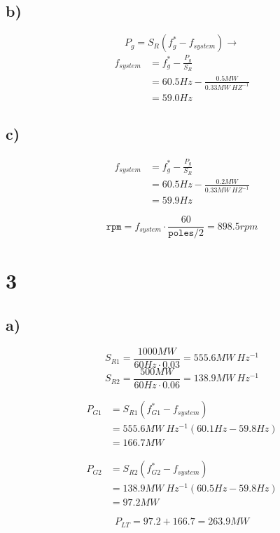 \documentclass[fleqn, twocolumn]{article}
\begin{document}
\subsection*{b)}
\label{sec:org7147f18}
\[P_g = S_R (f_g^* - f_{system}) \to\]
\begin{align*}
  f_{system} &= f_g^* - \frac{P_g}{S_R} \\
  &= 60.5\si{Hz} - \frac{0.5\si{MW}}{0.33\si{MW \ HZ^{-1}}} \\
  &= \boxed{59.0\si{Hz}}
\end{align*}

\subsection*{c)}
\label{sec:org6d86e3e}
\begin{align*}
  f_{system} &= f_g^* - \frac{P_g}{S_R} \\
  &= 60.5\si{Hz} - \frac{0.2\si{MW}}{0.33\si{MW \ HZ^{-1}}} \\
  &= \boxed{59.9\si{Hz}}
\end{align*}

\[\texttt{rpm} = f_{system} \cdot \frac{60}{\texttt{poles}/2} = \boxed{898.5\si{rpm}}\]

\section*{3}
\label{sec:org0e45de2}
\subsection*{a)}
\label{sec:org95f543e}
\[S_{R1} = \frac{1000\si{MW}}{60\si{Hz}\cdot 0.03} = 555.6 \si{MW \ Hz^{-1}}\]
\[S_{R2} = \frac{500\si{MW}}{60\si{Hz}\cdot 0.06} = 138.9 \si{MW \ Hz^{-1}}\]

\begin{align*}
  P_{G1} &= S_{R1}(f_{G1}^* - f_{system}) \\
  &= 555.6\si{MW \ Hz^{-1}} (60.1\si{Hz} - 59.8\si{Hz}) \\
  &= \boxed{166.7\si{MW}}
\end{align*}

\begin{align*}
  P_{G2} &= S_{R2}(f_{G2}^* - f_{system}) \\
  &= 138.9\si{MW \ Hz^{-1}} (60.5\si{Hz} - 59.8\si{Hz}) \\
  &= \boxed{97.2\si{MW}}
\end{align*}

\[P_{LT} = 97.2 + 166.7 = \boxed{263.9\si{MW}}\]
\end{document}
